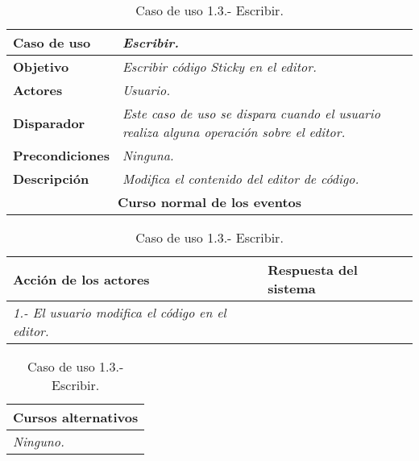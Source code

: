    \begin{table}[!ht] %
      \centering
      \begin{tabular}{|p{4cm}|p{11.5cm}|}
      \hline
         \textbf{Caso de uso} & \textit{Escribir.}\\ \hline
         \textbf{Objetivo} & \textit{Escribir código Sticky en el editor.}\\ \hline
         \textbf{Actores} & \textit{Usuario.}\\ \hline
         \textbf{Disparador} & \textit{Este caso de uso se dispara cuando el usuario realiza alguna operación sobre el editor.}\\ \hline
         \textbf{Precondiciones} & \textit{Ninguna.}\\ \hline 
         \textbf{Descripción} & \textit{Modifica el contenido del editor de código.}\\ \hline
         \multicolumn{2}{|c|}{\textbf{Curso normal de los eventos}}\\ \hline
    \end{tabular}
    \begin{tabular}{|p{7.75cm}|p{7.75cm}|}
      \hspace{2cm}\textbf{Acción de los actores} & \hspace{1.75cm}\textbf{Respuesta del sistema}\\ \hline
      \textit{1.- El usuario modifica el código en el editor.} &  \\ \hline
    \end{tabular}
    \begin{tabular}{|p{15.9cm}|}
      \hspace{6cm}\textbf{Cursos alternativos}\\ \hline     
      \textit{Ninguno.} \\ \hline
    \end{tabular}
    \caption{Caso de uso 1.3.- Escribir.}
   \end{table}


